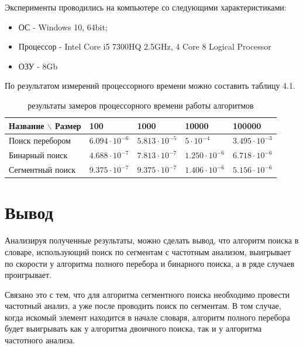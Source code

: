 \documentclass[12pt,a4paper]{report}
\begin{document}
Эксперименты проводились на компьютере со следующими характеристиками:
\begin{itemize}
    \item ОС - Windows 10, 64bit;
    \item Процессор - Intel Core i5 7300HQ 2.5GHz, 4 Core 8 Logical Processor
    \item ОЗУ - 8Gb
\end{itemize}

По результатом измерений процессорного времени можно составить таблицу 4.1.

\begin{table}[h!]
\caption{результаты замеров процессорного времени работы алгоритмов}
\label{tabular:timesandtenses}
\begin{center}
\begin{tabular}{ | l | l | l | l | l | }
\hline
    Название $\backslash$ Размер & 100                   & 1000                  & 10000                 & 100000                \\ \hline
    Поиск перебором  & $6.094 \cdot 10^{-6}$ & $5.813 \cdot 10^{-5}$ & $5 \cdot 10^{-4}$     & $3.495 \cdot 10^{-3}$ \\ \hline
    Бинарный поиск   & $4.688 \cdot 10^{-7}$ & $7.813 \cdot 10^{-7}$ & $1.250 \cdot 10^{-6}$ & $6.718 \cdot 10^{-6}$ \\ \hline
    Сегментный поиск & $9.375 \cdot 10^{-7}$ & $9.375 \cdot 10^{-7}$ & $1.406 \cdot 10^{-6}$ & $5.156 \cdot 10^{-6}$ \\ \hline
\end{tabular}
\end{center}
\end{table}

\section{Вывод}

Анализируя полученные результаты, можно сделать вывод, что алгоритм поиска в словаре, использующий поиск 
по сегментам с частотным анализом, выигрывает по скорости у алгоритма полного перебора и бинарного поиска, 
а в ряде случаев проигрывает.

Связано это с тем, что для алгоритма сегментного поиска необходимо провести частотный анализ, а уже после 
проводить поиск по сегментам. 
В том случае, когда искомый элемент находится в начале словаря, алгоритм полного перебора будет выигрывать 
как у алгоритма двоичного поиска, так и у алгоритма частотного анализа.
\end{document}
